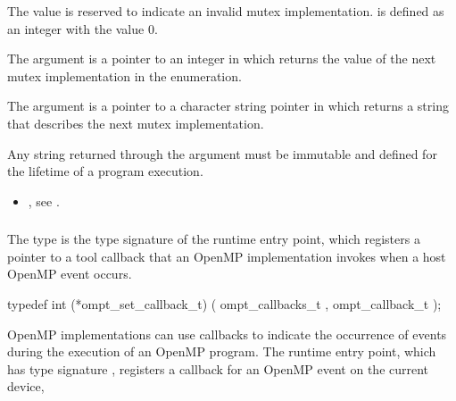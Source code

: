 The value  is reserved to indicate an invalid 
mutex implementation.  is defined as an integer 
with the value 0.

The  argument is a pointer to an integer in which 
 returns the value of the next mutex 
implementation in the enumeration.

The  argument is a pointer to a character string pointer
in which  returns a string that describes
the next mutex implementation.

\constraints
Any string returned through the  argument must be 
immutable and defined for the lifetime of a program execution.

\crossreferences
\begin{itemize}
\item {}, see .
\end{itemize}



\subsubsection{}
\label{sec:ompt_set_callback_t}
\label{sec:ompt_set_callback}

\summary
The  type is the type signature of the 
 runtime entry point, which registers a
pointer to a tool callback that an OpenMP implementation invokes 
when a host OpenMP event occurs.

\format
\begin{ccppspecific}
\begin{omptCallback}
typedef int (*ompt_set_callback_t) (
  ompt_callbacks_t ,
  ompt_callback_t 
);
\end{omptCallback}
\end{ccppspecific}

\descr
OpenMP implementations can use callbacks to indicate the occurrence of events 
during the execution of an OpenMP program. The  runtime
entry point, which has type signature , registers a 
callback for an OpenMP event on the current device,

